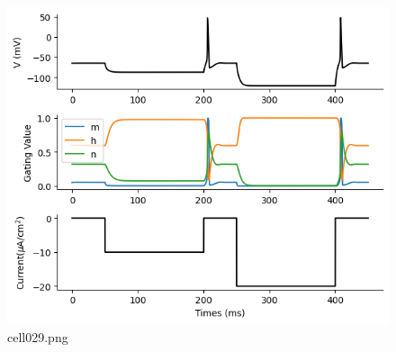 \begin{figure}[ht]
	\centering
	\includegraphics[scale=0.8, max width=\linewidth]{./fig/neuron-model/hodgkin-huxley/cell029.png}
	\caption{cell029.png}
	\label{cell029.png}
\end{figure}